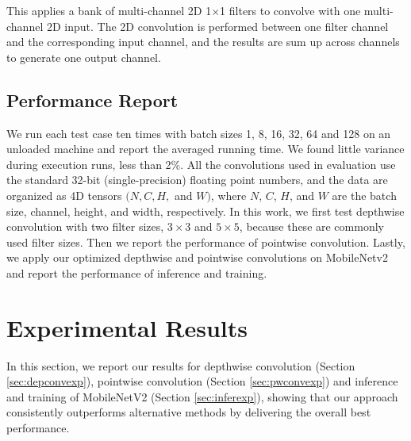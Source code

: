  This applies a bank of multi-channel 2D 1$\times$1 filters to convolve with one multi-channel 2D input. 
The 2D convolution is performed between one filter channel and the corresponding input channel, and the results are sum up across channels to generate one output channel.


\subsection{Performance Report}
We run each test case ten times with batch sizes 1, 8, 16, 32, 64 and 128 on an unloaded machine and report the averaged running time. 
We found little variance during execution runs, less than 2\%.  
All the convolutions used in evaluation use the standard 32-bit (single-precision) floating point numbers, and the data are organized as 4D tensors $(N,C,H,$ and $W)$, where $N$, $C$, $H$, and $W$ are the batch size, channel, height, and width, respectively. 
In this work, we first test depthwise convolution with two filter sizes, $3 \times 3$ and $5 \times 5$, because these are commonly used filter sizes. 
Then we report the performance of pointwise convolution. 
Lastly, we apply our optimized depthwise and pointwise convolutions on MobileNetv2 and report the performance of inference and training.
%

\section{Experimental Results}
\label{exp} In this section, we report our results for depthwise convolution (Section \ref{sec:depconvexp}), pointwise convolution (Section \ref{sec:pwconvexp}) and inference and training of MobileNetV2 (Section \ref{sec:inferexp}), showing that our approach consistently outperforms alternative methods by delivering the overall best performance.


